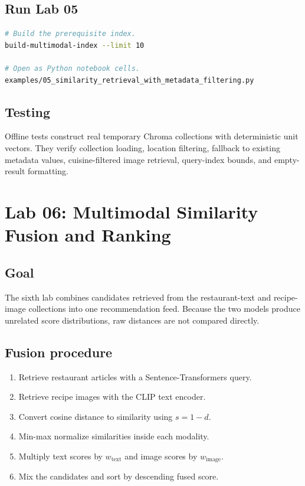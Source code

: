 \documentclass[11pt]{article}
\begin{document}
\subsection{Run Lab 05}

\begin{lstlisting}[language=bash]
# Build the prerequisite index.
build-multimodal-index --limit 10

# Open as Python notebook cells.
examples/05_similarity_retrieval_with_metadata_filtering.py
\end{lstlisting}

\subsection{Testing}

Offline tests construct real temporary Chroma collections with deterministic
unit vectors. They verify collection loading, location filtering, fallback to
existing metadata values, cuisine-filtered image retrieval, query-index bounds,
and empty-result formatting.

\section{Lab 06: Multimodal Similarity Fusion and Ranking}

\subsection{Goal}

The sixth lab combines candidates retrieved from the restaurant-text and
recipe-image collections into one recommendation feed. Because the two models
produce unrelated score distributions, raw distances are not compared
directly.

\subsection{Fusion procedure}

\begin{enumerate}
  \item Retrieve restaurant articles with a Sentence-Transformers query.
  \item Retrieve recipe images with the CLIP text encoder.
  \item Convert cosine distance to similarity using \(s = 1 - d\).
  \item Min-max normalize similarities inside each modality.
  \item Multiply text scores by \(w_{\mathrm{text}}\) and image scores by
        \(w_{\mathrm{image}}\).
  \item Mix the candidates and sort by descending fused score.
\end{enumerate}
\end{document}
